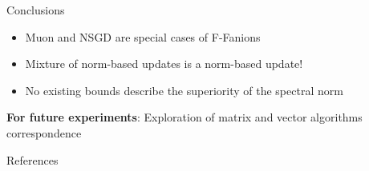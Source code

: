 \documentclass[aspectratio=169]{beamer}
\begin{document}
\begin{frame}{Conclusions}
  \begin{itemize}
    \item Muon and NSGD are special cases of F-Fanions
    \item Mixture of norm-based updates is a norm-based update!
    \item No existing bounds describe the superiority of the spectral norm
  \end{itemize}

  \vspace{2em}
  \textbf{For future experiments}: Exploration of matrix and vector algorithms correspondence
\end{frame}

\begin{frame}[allowframebreaks]{References}
  \printbibliography
\end{frame}
\end{document}
